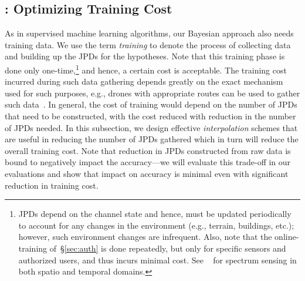

\subsection{\ildw: Optimizing Training Cost}
\label{sec:training}
\label{sec:inter}

As in supervised machine learning algorithms, our Bayesian approach
also needs training data.  We use the term
\emph{training} to denote the process of collecting data and building
up the JPDs for the hypotheses. Note that this training phase is done
only one-time,\footnote{JPDs depend on the channel state and
    hence, must be updated periodically to account for any changes in
    the environment (e.g., terrain, buildings, etc.); however, such
    environment changes are infrequent. Also, note that the
    online-training of~\S\ref{sec:auth} is done repeatedly, but only
    for specific sensors and authorized users, and thus incurs minimal
    cost. See ~\cite{mobicom19-bigspec} for spectrum sensing in both spatio and temporal domains. }
and hence, a certain cost is acceptable. The training cost
incurred during such data gathering depends greatly on the exact
mechanism used for such purposes, e.g., drones with appropriate routes
can be used to gather such data~\cite{robot-ref}.  In general, the
cost of training would depend on the number of JPDs that need to be
constructed, with the cost reduced with reduction in the number of
JPDs needed. In this subsection, we design effective {\em interpolation}
schemes that are useful in reducing the number of JPDs gathered which
in turn will reduce the overall training cost. Note that reduction in
JPDs constructed from raw data is bound to negatively impact the
accuracy---we will evaluate this trade-off in our evaluations and show
that impact on accuracy is minimal even with significant reduction in
training cost.

